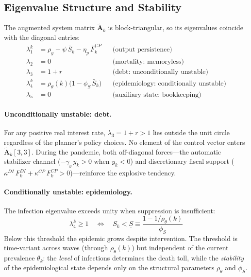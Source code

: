 \documentclass[12pt, a4paper]{article}
\begin{document}
\subsection{Eigenvalue Structure and Stability}
\label{app:stability}

The augmented system matrix $\tilde{\bm{A}}_k$ is block-triangular, so its
eigenvalues coincide with the diagonal entries:
%
\begin{align}
    \lambda_1^k &= \rho_y + \psi\,\bar{S}_k - \eta_p\,\bar{F}_k^{CP}
        && \text{(output persistence)}
    \label{eq:lam1} \\[3pt]
    \lambda_2   &= 0
        && \text{(mortality: memoryless)}
    \label{eq:lam2} \\[3pt]
    \lambda_3   &= 1 + r
        && \text{(debt: unconditionally unstable)}
    \label{eq:lam3} \\[3pt]
    \lambda_4^k &= \rho_\theta(k)\bigl(1 - \phi_S\,\bar{S}_k\bigr)
        && \text{(epidemiology: conditionally unstable)}
    \label{eq:lam4} \\[3pt]
    \lambda_5   &= 0
        && \text{(auxiliary state: bookkeeping)}
    \label{eq:lam5}
\end{align}

\paragraph{Unconditionally unstable: debt.}
For any positive real interest rate, $\lambda_3 = 1 + r > 1$ lies outside the
unit circle regardless of the planner's policy choices. No element of the control
vector enters $\tilde{\bm{A}}_k[3,3]$. During the pandemic, both off-diagonal
forces---the automatic stabilizer channel ($-\gamma_y\, y_k > 0$ when
$y_k < 0$) and discretionary fiscal support
($\kappa^{DI}\, F_k^{DI} + \kappa^{CP}\, F_k^{CP} > 0$)---reinforce the
explosive tendency.

\paragraph{Conditionally unstable: epidemiology.}
The infection eigenvalue exceeds unity when suppression is insufficient:
%
\begin{equation}
    \lambda_4^k \geq 1
    \quad\Longleftrightarrow\quad
    S_k < \underline{S} \equiv
    \frac{1 - 1/\rho_\theta(k)}{\phi_S}
    \label{eq:S_threshold}
\end{equation}
%
Below this threshold the epidemic grows despite intervention. The threshold
is time-variant across waves (through $\rho_\theta(k)$) but independent of
the current prevalence $\theta_k$: the \textit{level} of infections determines
the death toll, while the \textit{stability} of the epidemiological state depends
only on the structural parameters $\rho_\theta$ and $\phi_S$.
\end{document}
